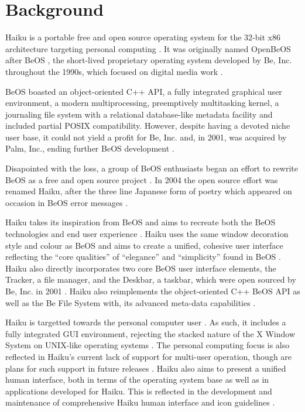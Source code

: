 \documentclass{article}
\begin{document}
\maketitle

\section{Background}

Haiku is a portable \cite{HaikuFaq} free and open source
\cite{HaikuDevFaq} operating system for the 32-bit x86 architecture
\cite{HaikuFaq} targeting personal computing \cite{HaikuAbout}.  It
was originally named OpenBeOS after BeOS \cite{HaikuWiki}, the
short-lived proprietary operating system developed by Be,
Inc. throughout the 1990s, which focused on digital media work
\cite{BeosWiki}.

BeOS boasted an object-oriented C++ API, a fully integrated graphical
user environment, a modern multiprocessing, preemptively multitasking
kernel, a journaling file system with a relational database-like
metadata facility \cite{BFSWiki} and included partial POSIX
compatibility.  However, despite having a devoted niche user base, it
could not yield a profit for Be, Inc. and, in 2001, was acquired by
Palm, Inc., ending further BeOS development \cite{BeosWiki}.

Disapointed with the loss, a group of BeOS enthusiasts began an
effort to rewrite BeOS as a free and open source project
\cite{BeosWiki, HaikuHistoryWiki}.  In 2004 the open source effort was
renamed Haiku, after the three line Japanese form of poetry which
appeared on occasion in BeOS error messages \cite{HaikuFaq,
  HaikuHistoryWiki}.

Haiku takes its inspiration from BeOS \cite{HaikuAbout} and aims to
recreate both the BeOS technologies and end user experience
\cite{HaikuFaq}.  Haiku uses the same window decoration style and
colour as BeOS \cite{HaikuWiki, BeosWiki} and aims to create a
unified, cohesive user interface \cite{HaikuAbout, HaikuHIG,
  HaikuIcon} reflecting the ``core qualities'' of ``elegance'' and
``simplicity'' found in BeOS \cite{HaikuFaq}.  Haiku also directly
incorporates two core BeOS user interface elements, the Tracker, a
file manager, and the Deskbar, a taskbar, which were open sourced by
Be, Inc. in 2001 \cite{HaikuFaq}.  Haiku also reimplements the
object-oriented C++ BeOS API\cite{HaikuWiki} as well as the Be File
System with, its advanced meta-data capabilities \cite{BFSWiki}.

Haiku is targetted towards the personal computer user
\cite{HaikuAbout}.  As such, it includes a fully integrated GUI
environment, rejecting the stacked nature of the X Window System on
UNIX-like operating systems \cite{HaikuFaq}.  The personal computing
focus is also reflected in Haiku's current lack of support for
multi-user operation, though are plans for such support in future
releases \cite{HaikuFuture}.  Haiku also aims to present a unified
human interface, both in terms of the operating system base as well as
in applications developed for Haiku.  This is reflected in the
development and maintenance of comprehensive Haiku human interface and
icon guidelines \cite{HaikuHIG, HaikuIcon}.
\end{document}
